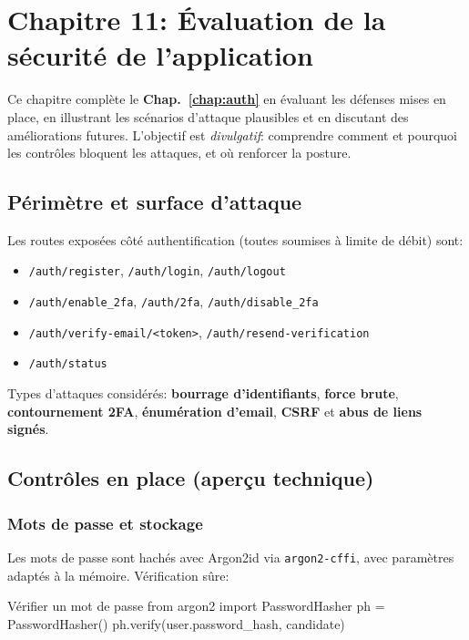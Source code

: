 \chapter{Chapitre 11: Évaluation de la sécurité de l'application}\label{chap:security}

\noindent Ce chapitre complète le \textbf{Chap.~\ref{chap:auth}} en évaluant les défenses mises en place, en illustrant les scénarios d'attaque plausibles et en discutant des améliorations futures. L'objectif est \emph{divulgatif}: comprendre comment et pourquoi les contrôles bloquent les attaques, et où renforcer la posture.

\section{Périmètre et surface d'attaque}
\noindent Les routes exposées côté authentification (toutes soumises à limite de débit) sont:
\begin{itemize}
  \item \texttt{/auth/register}, \texttt{/auth/login}, \texttt{/auth/logout}
  \item \texttt{/auth/enable\_2fa}, \texttt{/auth/2fa}, \texttt{/auth/disable\_2fa}
  \item \texttt{/auth/verify-email/<token>}, \texttt{/auth/resend-verification}
  \item \texttt{/auth/status}
\end{itemize}
\noindent Types d'attaques considérés: \textbf{bourrage d'identifiants}, \textbf{force brute}, \textbf{contournement 2FA}, \textbf{énumération d'email}, \textbf{CSRF} et \textbf{abus de liens signés}.

\section{Contrôles en place (aperçu technique)}

\subsection*{Mots de passe et stockage}
\noindent Les mots de passe sont hachés avec Argon2id via \texttt{argon2-cffi}, avec paramètres adaptés à la mémoire. Vérification sûre:
\begin{codebox}[language=Python]{Vérifier un mot de passe}
from argon2 import PasswordHasher
ph = PasswordHasher()
ph.verify(user.password_hash, candidate)
\end{codebox}

